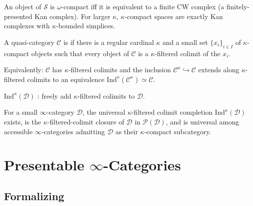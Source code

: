 \begin{example_thm}
\label{ex:compact-in-S}
An object of $\mathcal{S}$ is $\omega$-compact iff it is equivalent to a
finite CW complex (a finitely-presented Kan complex). For larger
$\kappa$, $\kappa$-compact spaces are exactly Kan complexes with
$\kappa$-bounded simplices.
\end{example_thm}

\begin{definition}
\label{def:accessible}
A quasi-category $\mathcal{C}$ is  if there is a regular
cardinal $\kappa$ and a small set $\{x_i\}_{i \in I}$ of $\kappa$-compact
objects such that every object of $\mathcal{C}$ is a $\kappa$-filtered
colimit of the $x_i$.

Equivalently: $\mathcal{C}$ has $\kappa$-filtered colimits and the
inclusion $\mathcal{C}^\kappa \hookrightarrow \mathcal{C}$ extends along
$\kappa$-filtered colimits to an equivalence
$\mathrm{Ind}^\kappa(\mathcal{C}^\kappa) \simeq \mathcal{C}$.
\end{definition}

\begin{howtosay}
$\mathrm{Ind}^\kappa(\mathcal{D})$ : freely add $\kappa$-filtered colimits to $\mathcal{D}$.
\end{howtosay}

\begin{theorem}
\label{thm:ind-accessibility}
For a small $\infty$-category $\mathcal{D}$, the universal $\kappa$-filtered
colimit completion $\mathrm{Ind}^\kappa(\mathcal{D})$ exists, is the
$\kappa$-filtered-colimit closure of $\mathcal{D}$ in $\mathcal{P}(\mathcal{D})$,
and is universal among accessible $\infty$-categories admitting $\mathcal{D}$
as their $\kappa$-compact subcategory.
\end{theorem}


\section{Presentable $\infty$-Categories}
\label{sec:presentable}

\subsection{Formalizing}

